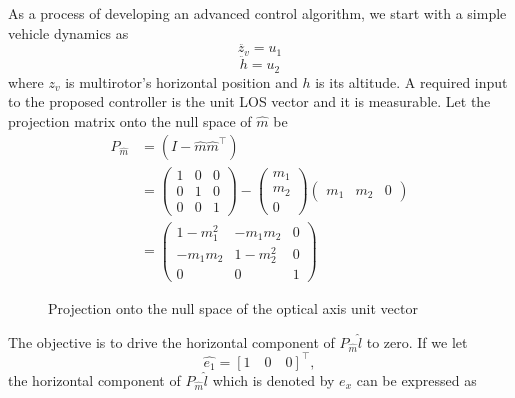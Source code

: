 As a process of developing an advanced control algorithm, we start with a simple vehicle dynamics as 
\begin{equation}
\ddot{z_v}=u_1
\end{equation}
\begin{equation}
\ddot{h}=u_2
\end{equation} where $z_v$ is multirotor's horizontal position and $h$ is its altitude.
A required input to the proposed controller is the unit LOS vector and it is measurable. 
Let the projection matrix onto the null space of $\hat{m}$ be 
\begin{align}
P_{\hat{m}}&=(I-\hat{m}\hat{m}^\top)
\\&=\begin{pmatrix}1 & 0 & 0 \\ 0 & 1 & 0 \\ 0 & 0 & 1 \end{pmatrix}
-\begin{pmatrix} m_1 \\ m_2 \\ 0 \end{pmatrix}\begin{pmatrix} m_1 & m_2 & 0 \end{pmatrix}
\\&=\begin{pmatrix}1-m_1^2 & -m_1m_2 & 0 \\ -m_1m_2 & 1-m_2^2 & 0 \\ 0 & 0 & 1 \end{pmatrix}
\label{p_mhat}
\end{align}
\begin{figure}[thpb]
	\centering
	\caption{Projection onto the null space of the optical axis unit vector}
	\label{projection}
\end{figure}
The objective is to drive the horizontal component of $P_{\hat{m}}\hat{l}$ to zero. If we let
\begin{equation}
\hat{e_1}=[1 \quad 0 \quad 0]^\top,
\label{e_1}
\end{equation}
the horizontal component of $P_{\hat{m}}\hat{l}$ which is denoted by $e_x$ can be expressed as
